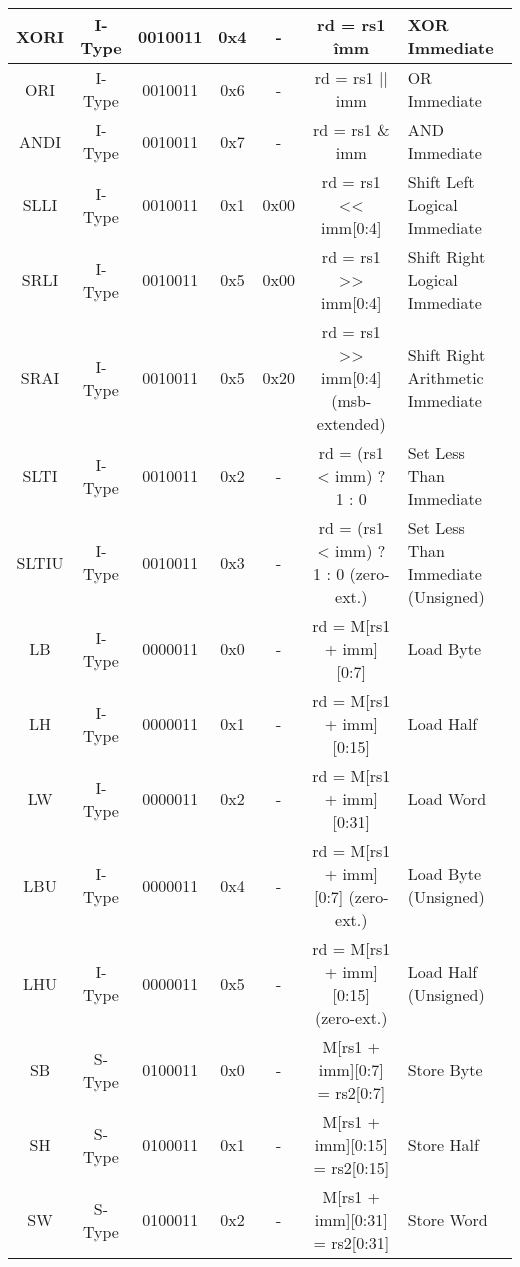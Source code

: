 \begin{table*}[h]
\begin{tabular*}{\textwidth}{|c|c|c|c|c|c|l|}
        XORI        & I-Type & 0010011  & 0x4    & -      & rd = rs1 \^ imm & XOR Immediate                  \\ \hline
        ORI         & I-Type & 0010011  & 0x6    & -      & rd = rs1 $||$ imm & OR Immediate                   \\ \hline
        ANDI        & I-Type & 0010011  & 0x7    & -      & rd = rs1 \& imm & AND Immediate                  \\ \hline
        SLLI        & I-Type & 0010011  & 0x1    & 0x00   & rd = rs1 << imm[0:4] & Shift Left Logical Immediate   \\ \hline
        SRLI        & I-Type & 0010011  & 0x5    & 0x00   & rd = rs1 >> imm[0:4] & Shift Right Logical Immediate  \\ \hline
        SRAI        & I-Type & 0010011  & 0x5    & 0x20   & rd = rs1 >> imm[0:4] (msb-extended) & Shift Right Arithmetic Immediate \\ \hline
        SLTI        & I-Type & 0010011  & 0x2    & -      & rd = (rs1 < imm) ? 1 : 0 & Set Less Than Immediate    \\ \hline
        SLTIU       & I-Type & 0010011  & 0x3    & -      & rd = (rs1 < imm) ? 1 : 0 (zero-ext.) & Set Less Than Immediate (Unsigned) \\ \hline
        LB          & I-Type & 0000011  & 0x0    & -      & rd = M[rs1 + imm][0:7] & Load Byte                  \\ \hline
        LH          & I-Type & 0000011  & 0x1    & -      & rd = M[rs1 + imm][0:15] & Load Half                  \\ \hline
        LW          & I-Type & 0000011  & 0x2    & -      & rd = M[rs1 + imm][0:31] & Load Word                  \\ \hline
        LBU         & I-Type & 0000011  & 0x4    & -      & rd = M[rs1 + imm][0:7] (zero-ext.) & Load Byte (Unsigned)     \\ \hline
        LHU         & I-Type & 0000011  & 0x5    & -      & rd = M[rs1 + imm][0:15] (zero-ext.) & Load Half (Unsigned)     \\ \hline
        SB          & S-Type & 0100011  & 0x0    & -      & M[rs1 + imm][0:7] = rs2[0:7] & Store Byte                     \\ \hline
        SH          & S-Type & 0100011  & 0x1    & -      & M[rs1 + imm][0:15] = rs2[0:15] & Store Half                   \\ \hline
        SW          & S-Type & 0100011  & 0x2    & -      & M[rs1 + imm][0:31] = rs2[0:31] & Store Word                   \\ \hline

\end{tabular*}
\end{table*}

